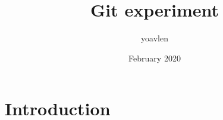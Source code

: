 \documentclass{article}
\title{Git experiment}
\author{yoavlen }
\date{February 2020}
\begin{document}
\maketitle

\section{Introduction}
\end{document}
